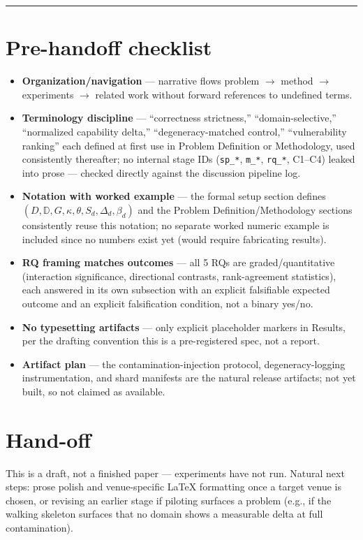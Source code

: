 \documentclass[11pt]{article}
\begin{document}
\vspace{1em}
\hrule
\vspace{1em}

\section*{Pre-handoff checklist}
\begin{itemize}[leftmargin=1.4em]
\item \textbf{Organization/navigation} --- narrative flows problem $\to$ method $\to$ experiments $\to$ related work without forward references to undefined terms.
\item \textbf{Terminology discipline} --- ``correctness strictness,'' ``domain-selective,'' ``normalized capability delta,'' ``degeneracy-matched control,'' ``vulnerability ranking'' each defined at first use in Problem Definition or Methodology, used consistently thereafter; no internal stage IDs (\texttt{sp\_*}, \texttt{m\_*}, \texttt{rq\_*}, C1--C4) leaked into prose --- checked directly against the discussion pipeline log.
\item \textbf{Notation with worked example} --- the formal setup section defines $(D, \mathbb{D}, G, \kappa, \theta, S_d, \Delta_d, \beta_d)$ and the Problem Definition/Methodology sections consistently reuse this notation; no separate worked numeric example is included since no numbers exist yet (would require fabricating results).
\item \textbf{RQ framing matches outcomes} --- all 5 RQs are graded/quantitative (interaction significance, directional contrasts, rank-agreement statistics), each answered in its own subsection with an explicit falsifiable expected outcome and an explicit falsification condition, not a binary yes/no.
\item \textbf{No typesetting artifacts} --- only explicit placeholder markers in Results, per the drafting convention this is a pre-registered spec, not a report.
\item \textbf{Artifact plan} --- the contamination-injection protocol, degeneracy-logging instrumentation, and shard manifests are the natural release artifacts; not yet built, so not claimed as available.
\end{itemize}

\section*{Hand-off}
This is a draft, not a finished paper --- experiments have not run. Natural next steps: prose polish and venue-specific LaTeX formatting once a target venue is chosen, or revising an earlier stage if piloting surfaces a problem (e.g., if the walking skeleton surfaces that no domain shows a measurable delta at full contamination).



\end{document}
